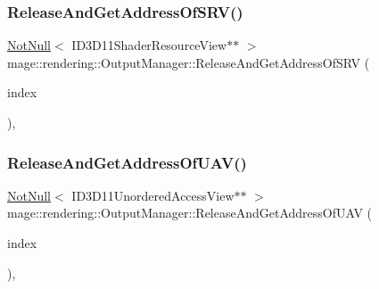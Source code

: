 \subsubsection{\texorpdfstring{Release\+And\+Get\+Address\+Of\+S\+R\+V()}{ReleaseAndGetAddressOfSRV()}}
{\footnotesize\ttfamily \mbox{\hyperlink{namespacemage_a8769f9d670d6b585ea306cb1062af94b}{Not\+Null}}$<$ I\+D3\+D11\+Shader\+Resource\+View$\ast$$\ast$ $>$ mage\+::rendering\+::\+Output\+Manager\+::\+Release\+And\+Get\+Address\+Of\+S\+RV (\begin{DoxyParamCaption}\item[{\mbox{\hyperlink{classmage_1_1rendering_1_1_output_manager_a941f1b35a83ee0ce190494523ec0fe63}{S\+R\+V\+Index}}}]{index }\end{DoxyParamCaption})\hspace{0.3cm}{\ttfamily [private]}, {\ttfamily [noexcept]}}

\mbox{\label{classmage_1_1rendering_1_1_output_manager_a79ec82aadfe89ea1a9875567d9bbb74a}} 
\subsubsection{\texorpdfstring{Release\+And\+Get\+Address\+Of\+U\+A\+V()}{ReleaseAndGetAddressOfUAV()}}
{\footnotesize\ttfamily \mbox{\hyperlink{namespacemage_a8769f9d670d6b585ea306cb1062af94b}{Not\+Null}}$<$ I\+D3\+D11\+Unordered\+Access\+View$\ast$$\ast$ $>$ mage\+::rendering\+::\+Output\+Manager\+::\+Release\+And\+Get\+Address\+Of\+U\+AV (\begin{DoxyParamCaption}\item[{\mbox{\hyperlink{classmage_1_1rendering_1_1_output_manager_a71b3797fef957312f92736f15b7ada3e}{U\+A\+V\+Index}}}]{index }\end{DoxyParamCaption})\hspace{0.3cm}{\ttfamily [private]}, {\ttfamily [noexcept]}}

\mbox{\label{classmage_1_1rendering_1_1_output_manager_aca32d0307be3acfaa8f5a20fa24b6934}} 
